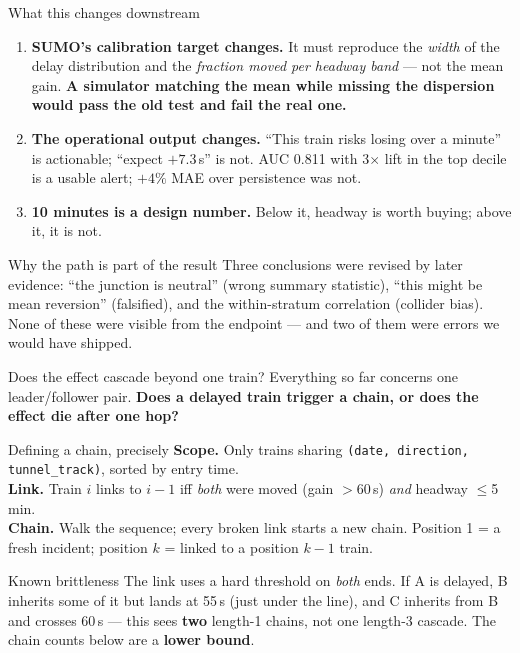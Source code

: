 \documentclass[aspectratio=169,10pt]{beamer}
\newcommand{\hl}[1]{{\color{corange}\textbf{#1}}}
\begin{document}
\begin{frame}{What this changes downstream}
  \begin{enumerate}
    \item \textbf{SUMO's calibration target changes.} It must reproduce the \emph{width} of
      the delay distribution and the \emph{fraction moved per headway band} --- not the mean
      gain. \hl{A simulator matching the mean while missing the dispersion would pass the old
      test and fail the real one.}
    \item \textbf{The operational output changes.} ``This train risks losing over a minute''
      is actionable; ``expect $+7.3$\,s'' is not. AUC 0.811 with 3$\times$ lift in the top
      decile is a usable alert; $+4\%$ MAE over persistence was not.
    \item \textbf{10 minutes is a design number.} Below it, headway is worth buying; above
      it, it is not.
  \end{enumerate}

  \vspace{0.9em}
  \begin{block}{\small Why the path is part of the result}
    \small Three conclusions were revised by later evidence: ``the junction is neutral''
    (wrong summary statistic), ``this might be mean reversion'' (falsified), and the
    within-stratum correlation (collider bias). None of these were visible from the endpoint
    --- and two of them were errors we would have shipped.
  \end{block}
\end{frame}

\begin{frame}{Does the effect cascade beyond one train?}
  Everything so far concerns one leader/follower pair. \textbf{Does a delayed train
  trigger a chain, or does the effect die after one hop?}

  \vspace{0.6em}
  \begin{block}{\small Defining a chain, precisely}
    \small
    \textbf{Scope.} Only trains sharing \texttt{(date, direction, tunnel\_track)},
    sorted by entry time.\\
    \textbf{Link.} Train $i$ links to $i{-}1$ iff \emph{both} were moved (gain
    $>$60\,s) \emph{and} headway $\leq$5\,min.\\
    \textbf{Chain.} Walk the sequence; every broken link starts a new chain.
    Position 1 = a fresh incident; position $k$ = linked to a position $k{-}1$ train.
  \end{block}

  \vspace{0.5em}
  \begin{alertblock}{\small Known brittleness}
    \small The link uses a hard threshold on \emph{both} ends. If A is delayed, B
    inherits some of it but lands at 55\,s (just under the line), and C inherits
    from B and crosses 60\,s --- this sees \textbf{two} length-1 chains, not one
    length-3 cascade. The chain counts below are a \textbf{lower bound}.
  \end{alertblock}
\end{frame}
\end{document}
